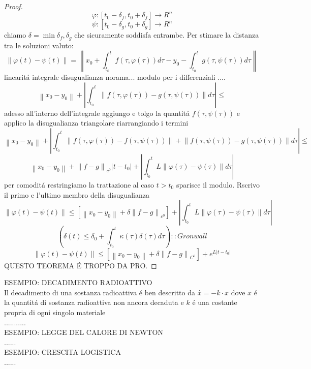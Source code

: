 \begin{proof}
	$$\varphi:\left[t_0-\delta_f,t_0+\delta_f\right]\to R^n$$
	$$\psi:\left[t_0-\delta_g,t_0+\delta_g\right]\to R^n$$
	chiamo $\delta=\min{\delta_f,\delta_g}$ che sicuramente soddisfa entrambe. Per stimare la distanza tra le soluzioni valuto:
	$$
	\left\|\varphi(t)-\psi(t)\right\|=
	\left\|  x_0+\int_{t_0}^t f(\tau,\varphi(\tau))d\tau - y_0 - \int_{t_0}^t g(\tau,\psi(\tau))d\tau\right\|
	$$
	linearit\'a integrale disugualianza norama... modulo per i differenziali ....\\
	$$ \left\| x_0-y_0\right\|+\left| \int_{t_0}^{t} \left\| f(\tau,\varphi(\tau))-g(\tau,\psi(\tau)) \right\|d\tau \right|\le$$
	adesso all'interno dell'integrale aggiungo e tolgo la quantit\'a $f(\tau,\psi(\tau))$ e applico la disugualianza triangolare riarrangiando i termini
	$$ \left\| x_0-y_0\right\|+\left| \int_{t_0}^{t} \left\| f(\tau,\varphi(\tau))-f(\tau,\psi(\tau))\right\|+\left\|f(\tau,\psi(\tau))-g(\tau,\psi(\tau)) \right\|d\tau \right|\le$$
	$$ \left\| x_0-y_0\right\| + \left\| f-g\right\|_{c^0}\left|t-t_0\right| +\left| \int_{t_0}^{t} L\left\|\varphi(\tau)-\psi(\tau)\right\| d\tau \right|$$
	per comodit\'a restringiamo la trattazione al caso $t>t_0$ sparisce il modulo. Rscrivo il primo e l'ultimo membro della disugualianza
	$$ \left\|\varphi(t)-\psi(t)\right\|\le  \left[ \left\| x_0-y_0\right\| + \delta\left\| f-g\right\|_{c^0}\right] +\left| \int_{t_0}^{t} L\left\|\varphi(\tau)-\psi(\tau)\right\| d\tau \right|$$
	$$ \left( \delta(t)\le\delta_0+\int_{t_0}^t \kappa(\tau)\delta(\tau)d\tau \right)::Gronwall$$
	$$ \left\| \varphi(t)-\psi(t)\right\|\le\left[\left\|x_0-y_0\right\|+\delta\left\|f-g\right\|_{C^0}\right]+e^{L\left|t-t_0\right|}$$
	QUESTO TEOREMA \'E TROPPO DA PRO.
\end{proof}
ESEMPIO: DECADIMENTO RADIOATTIVO\\
Il decadimento di una sostanza radioattiva \'e ben descritto da $\overset{\cdot}{x}=-k\cdot x$ dove $x$ \'e la quantit\'a di sostanza radioattiva non ancora decaduta e $k$ \'e una costante propria di ogni singolo materiale\\
...........\\
ESEMPIO: LEGGE DEL CALORE DI NEWTON\\
......\\
ESEMPIO: CRESCITA LOGISTICA\\
......\\
